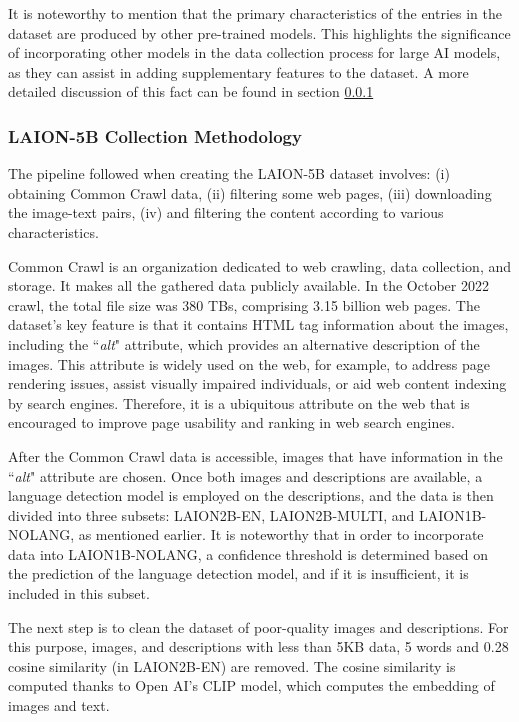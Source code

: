 It is noteworthy to mention that the primary characteristics of the entries in the dataset are produced by other pre-trained models. This highlights the significance of incorporating other models in the data collection process for large AI models, as they can assist in adding supplementary features to the dataset. A more detailed discussion of this fact can be found in section \ref{LCollection}

\subsubsection{LAION-5B Collection Methodology} \label{LCollection}

The pipeline followed when creating the LAION-5B dataset involves: (i) obtaining Common Crawl data, (ii) filtering some web pages, (iii) downloading the image-text pairs, (iv) and filtering the content according to various characteristics.

Common Crawl is an organization dedicated to web crawling, data collection, and storage. It makes all the gathered data publicly available. In the October 2022 crawl, the total file size was 380 TBs, comprising 3.15 billion web pages. The dataset's key feature is that it contains HTML tag information about the images, including the ``\textit{alt}" attribute, which provides an alternative description of the images. This attribute is widely used on the web, for example, to address page rendering issues, assist visually impaired individuals, or aid web content indexing by search engines. Therefore, it is a ubiquitous attribute on the web that is encouraged to improve page usability and ranking in web search engines.

After the Common Crawl data is accessible, images that have information in the ``\textit{alt}" attribute are chosen. Once both images and descriptions are available, a language detection model is employed on the descriptions, and the data is then divided into three subsets: LAION2B-EN, LAION2B-MULTI, and LAION1B-NOLANG, as mentioned earlier. It is noteworthy that in order to incorporate data into LAION1B-NOLANG, a confidence threshold is determined based on the prediction of the language detection model, and if it is insufficient, it is included in this subset.

The next step is to clean the dataset of poor-quality images and descriptions. For this purpose, images, and descriptions with less than 5KB data, 5 words and 0.28 cosine similarity (in LAION2B-EN) are removed. The cosine similarity is computed thanks to Open AI's CLIP model, which computes the embedding of images and text.

